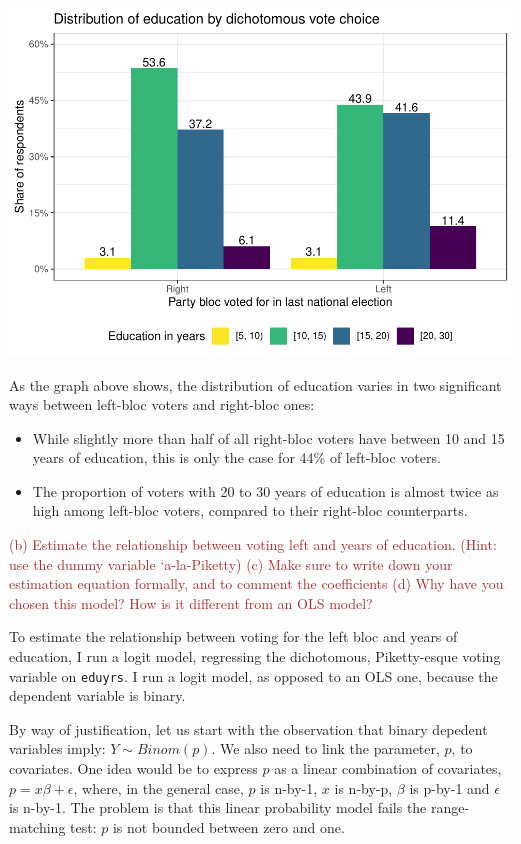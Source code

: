 \documentclass[
]{article}
\begin{document}
\begin{center}\includegraphics{AVCD-Assignment1-Edenhofer_files/figure-latex/edu-distribution-by-left-right-1} \end{center}

As the graph above shows, the distribution of education varies in two
significant ways between left-bloc voters and right-bloc ones:

\begin{itemize}
\item
  While slightly more than half of all right-bloc voters have between 10
  and 15 years of education, this is only the case for 44\% of left-bloc
  voters.
\item
  The proportion of voters with 20 to 30 years of education is almost
  twice as high among left-bloc voters, compared to their right-bloc
  counterparts.
\end{itemize}

\textcolor{brown}{(b) Estimate the relationship between voting left and years of education. (Hint: use the dummy variable `a-la-Piketty) (c) Make sure to write down your estimation equation formally, and to comment the coefficients (d) Why have you chosen this model? How is it different from an OLS model?}

To estimate the relationship between voting for the left bloc and years
of education, I run a logit model, regressing the dichotomous,
Piketty-esque voting variable on \texttt{eduyrs}. I run a logit model,
as opposed to an OLS one, because the dependent variable is binary.

By way of justification, let us start with the observation that binary
depedent variables imply: \(Y \sim Binom(p).\) We also need to link the
parameter, \(p\), to covariates. One idea would be to express \(p\) as a
linear combination of covariates, \(p = x\beta + \epsilon\), where, in
the general case, \(p\) is n-by-1, \(x\) is n-by-p, \(\beta\) is p-by-1
and \(\epsilon\) is n-by-1. The problem is that this linear probability
model fails the range-matching test: \(p\) is not bounded between zero
and one.
\end{document}
